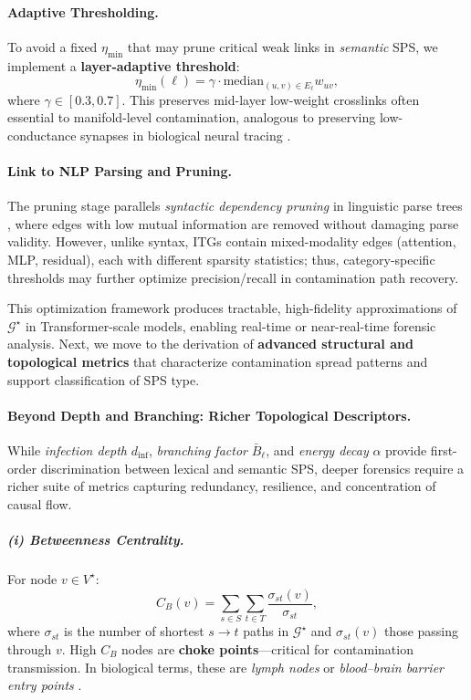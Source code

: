 \documentclass[11pt]{article}
\begin{document}
\paragraph{Adaptive Thresholding.}
To avoid a fixed $\eta_{\min}$ that may prune critical weak links in \textit{semantic} SPS, we implement a \textbf{layer-adaptive threshold}:
\[
\eta_{\min}(\ell) = \gamma \cdot \mathrm{median}_{(u,v)\in E_\ell} w_{uv},
\]
where $\gamma \in [0.3,0.7]$.  
This preserves mid-layer low-weight crosslinks often essential to manifold-level contamination, analogous to preserving low-conductance synapses in biological neural tracing \citep{sporns2004organization}.

\paragraph{Link to NLP Parsing and Pruning.}
The pruning stage parallels \textit{syntactic dependency pruning} in linguistic parse trees \citep{kiperwasser2016simple}, where edges with low mutual information are removed without damaging parse validity.  
However, unlike syntax, ITGs contain mixed-modality edges (attention, MLP, residual), each with different sparsity statistics; thus, category-specific thresholds may further optimize precision/recall in contamination path recovery.

\bigskip
This optimization framework produces tractable, high-fidelity approximations of $\mathcal{G}^\star$ in Transformer-scale models, enabling real-time or near-real-time forensic analysis.  
Next, we move to the derivation of \textbf{advanced structural and topological metrics} that characterize contamination spread patterns and support classification of SPS type.


\paragraph{Beyond Depth and Branching: Richer Topological Descriptors.}
While \emph{infection depth} $d_{\mathrm{inf}}$, \emph{branching factor} $\bar{B}_\ell$, and \emph{energy decay} $\alpha$ provide first-order discrimination between lexical and semantic SPS, deeper forensics require a richer suite of metrics capturing redundancy, resilience, and concentration of causal flow.

\subparagraph{(i) Betweenness Centrality.}
For node $v \in V^\star$:
\[
C_B(v) = \sum_{s \in S} \sum_{t \in T} \frac{\sigma_{st}(v)}{\sigma_{st}},
\]
where $\sigma_{st}$ is the number of shortest $s \to t$ paths in $\mathcal{G}^\star$ and $\sigma_{st}(v)$ those passing through $v$.  
High $C_B$ nodes are \textbf{choke points}—critical for contamination transmission. In biological terms, these are \emph{lymph nodes} or \emph{blood–brain barrier entry points} \citep{meyer2005central}.
\end{document}
